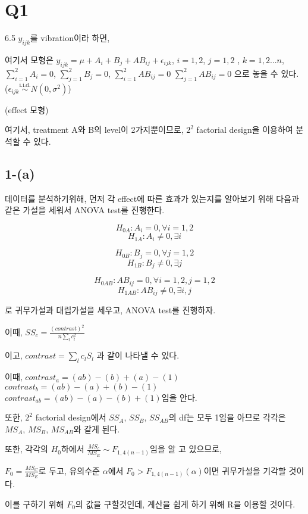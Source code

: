 \documentclass{article}
\begin{document}
\pagestyle{fancy}


\section{Q1} 

6.5
$y_{ijk}$를 vibration이라 하면,

여기서 모형은 
$y_{ijk} = \mu + A_i + B_j + AB_{ij} + \epsilon_{ijk}$, $i = 1,2$, $j = 1, 2$ ,  $k = 1, 2... n$, $\sum_{i=1}^2 A_i = 0 $, $\sum_{j=1}^2 B_j = 0 $, $\sum_{i=1}^2 AB_{ij} = 0 $ $\sum_{j=1}^2 AB_{ij} = 0 $ 으로 놓을 수 있다.
($\epsilon_{ijk}  \overset{\text{i.i.d.}}{\sim} N(0, \sigma^2)$)

(effect 모형)

여기서, treatment A와 B의 level이 2가지뿐이므로, $2^2$ factorial design을 이용하여 분석할 수 있다.

\subsection{1-(a)}

데이터를 분석하기위해, 먼저 각 effect에 따른 효과가 있는지를 알아보기 위해 다음과 같은 가설을 세워서 ANOVA test를 진행한다.


$$H_{0A} : A_i = 0 , \forall i = 1, 2$$ 
$$H_{1A} : A_i \neq 0, \exists i$$


$$H_{0B} : B_j = 0 , \forall j = 1, 2$$ 
$$H_{1B} : B_j \neq 0, \exists j$$

$$H_{0AB} : AB_{ij} = 0 , \forall i = 1, 2, j = 1, 2$$ 
$$H_{1AB} : AB_{ij} \neq 0, \exists i, j$$


로 귀무가설과 대립가설을 세우고, ANOVA test를 진행하자.

이때, $SS_c = \frac{(contrast)^2}{n \sum_l c_l^2 }$

이고, $contrast = \sum_l c_l S_l$ 과 같이 나타낼 수 있다.


이때, $contrast_a = (ab) - (b) + (a) - (1)$
$contrast_b = (ab) - (a) + (b) - (1)$
$contrast_{ab} = (ab) - (a) - (b) + (1)$임을 안다.

또한, $2^2$ factorial design에서 $SS_A$, $SS_B$, $SS_{AB}$의 df는 모두 1임을 아므로 각각은 $MS_A$, $MS_B$, $MS_{AB}$와 같게 된다. 

또한, 각각의 $H_0$하에서 $\frac{MS_c}{MS_E} \sim F_{1, 4(n-1)}$임을 알 고 있으므로,

$F_0 = \frac{MS_{C}}{MS_E}$로 두고, 유의수준 $\alpha$에서 $F_0 > F_{1, 4(n-1)}(\alpha)$이면 귀무가설을 기각할 것이다.

이를 구하기 위해 $F_0$의 값을 구할것인데, 계산을 쉽게 하기 위해 R을 이용할 것이다.
\end{document}
